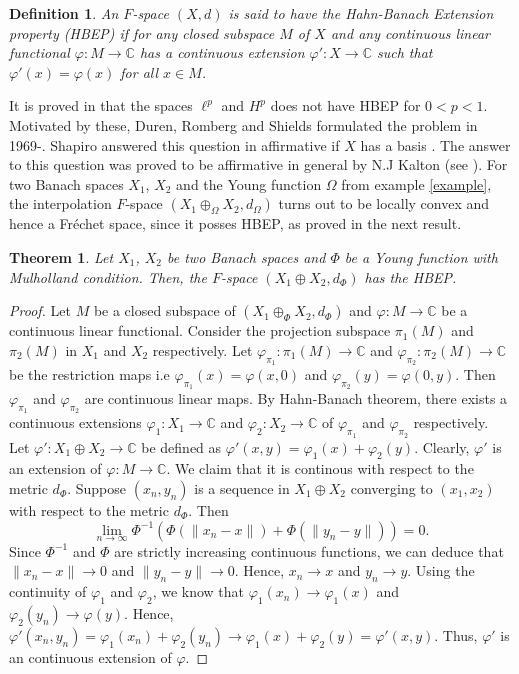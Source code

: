 \documentclass[pdflatex,sn-mathphys-num]{sn-jnl}%
\newtheorem{definition}{Definition}
\theoremstyle{thmstyleone}%
\newtheorem{theorem}{Theorem}%
\theoremstyle{thmstyletwo}%
\theoremstyle{thmstylethree}%
\begin{document}
	\begin{definition}
		An $F$-space $(X,d)$ is said to have the Hahn-Banach Extension property (HBEP) if for any closed subspace $M$ of $X$ and any continuous linear functional $\varphi:M\to\mathbb C$ has a continuous extension $\varphi':X\to \mathbb C$ such that $\varphi'(x)=\varphi(x)$ for all $x\in M$.
	\end{definition}
	 It is proved in \cite[Ch. 2,3]{Kalton} that the spaces $\ell^p$ and $H^p$ does not have HBEP for $0<p<1$. Motivated by these, Duren, Romberg and Shields formulated the problem in 1969-. Shapiro answered this question in affirmative if $X$ has a basis \cite{Shapiro} . The answer to this question was proved to be affirmative in general by N.J Kalton (see \cite[Theorem 4.8]{Kalton}).
	 For two Banach spaces $X_1$, $X_2$ and the Young function $\Omega$ from example \ref{example}, the interpolation $F$-space $\left(X_1\oplus_\Omega X_2, d_\Omega\right)$ turns out to be locally convex and hence a Fréchet space, since it posses HBEP, as proved in the next result.
	 \begin{theorem}
	 	Let $X_1$, $X_2$ be two Banach spaces and $\Phi$ be a Young function with Mulholland condition. Then, the $F$-space $\left(X_1\oplus X_2,d_\Phi\right)$ has the HBEP.
	 \end{theorem}
	 \begin{proof}
	 	Let $M$ be a closed subspace of $(X_1\oplus_\Phi X_2, d_\Phi)$ and $\varphi:M\to \mathbb C$ be a continuous linear functional. Consider the projection subspace $\pi_1(M)$ and $\pi_2(M)$ in $X_1$ and $X_2$ respectively. Let $\varphi_{\pi_1}:\pi_1(M)\to \mathbb C$ and $\varphi_{\pi_2}:\pi_2(M)\to \mathbb C$ be the restriction maps i.e $\varphi_{\pi_1}(x)=\varphi(x,0)$ and $\varphi_{\pi_2}(y)=\varphi(0,y)$. Then $\varphi_{\pi_1}$ and $\varphi_{\pi_2}$ are continuous linear maps. By Hahn-Banach theorem, there exists a continuous extensions $\varphi_1:X_1\to \mathbb C$ and $\varphi_2:X_2\to \mathbb C$ of $\varphi_{\pi_1}$ and $\varphi_{\pi_2}$ respectively. Let $\varphi':X_1\oplus X_2\to \mathbb C$ be defined as $\varphi'(x,y)=\varphi_1(x)+\varphi_2(y)$. Clearly, $\varphi'$ is an extension of $\varphi:M\to \mathbb C$. We claim that it is continous with respect to the metric $d_\Phi$. Suppose $(x_n,y_n)$ is a sequence in $X_1\oplus X_2$ converging to $(x_1,x_2)$ with respect to the metric $d_\Phi$. Then $$\lim_{n\to \infty}\Phi^{-1}\left(\Phi(\|x_n-x\|)+\Phi(\|y_n-y\|)\right)=0.$$
	 	Since $\Phi^{-1}$ and $\Phi$ are strictly increasing continuous functions, we can deduce that $\|x_n-x\|\to 0$ and $\|y_n-y\|\to 0$.  Hence, $x_n\to x$ and $y_n\to y$. Using the continuity of $\varphi_1$ and $\varphi_2$, we know that $\varphi_1(x_n)\to\varphi_1(x)$ and $\varphi_2(y_n)\to\varphi(y)$. Hence, $\varphi'(x_n,y_n)=\varphi_1(x_n)+\varphi_2(y_n)\to\varphi_1(x)+\varphi_2(y)=\varphi'(x,y)$. Thus, $\varphi'$ is an continuous extension of $\varphi$.
	 \end{proof}
	 
\end{document}
